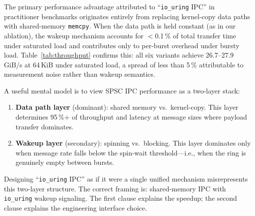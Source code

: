 \documentclass[10pt,conference]{IEEEtran}
\begin{document}
The primary performance advantage attributed to ``\texttt{io\_uring} IPC'' in
practitioner benchmarks originates entirely from replacing kernel-copy data
paths with shared-memory \texttt{memcpy}.  When the data path is held constant
(as in our ablation), the wakeup mechanism accounts for $<$0.1\,\% of total
transfer time under saturated load and contributes only to per-burst overhead
under bursty load.  Table~\ref{tab:throughput} confirms this: all six variants
achieve 26.7--27.9\,GiB/s at 64\,KiB under saturated load, a spread of less
than 5\,\% attributable to measurement noise rather than wakeup semantics.

A useful mental model is to view SPSC IPC performance as a two-layer stack:
\begin{enumerate}
  \item \textbf{Data path layer} (dominant): shared memory vs.\ kernel-copy.
        This layer determines 95\,\%+ of throughput and latency at message
        sizes where payload transfer dominates.
  \item \textbf{Wakeup layer} (secondary): spinning vs.\ blocking.  This
        layer dominates only when message rate falls below the spin-wait
        threshold---i.e., when the ring is genuinely empty between bursts.
\end{enumerate}

Designing ``\texttt{io\_uring} IPC'' as if it were a single unified mechanism
misrepresents this two-layer structure.  The correct framing is: shared-memory
IPC with \texttt{io\_uring} wakeup signaling.  The first clause explains the
speedup; the second clause explains the engineering interface choice.
\end{document}
